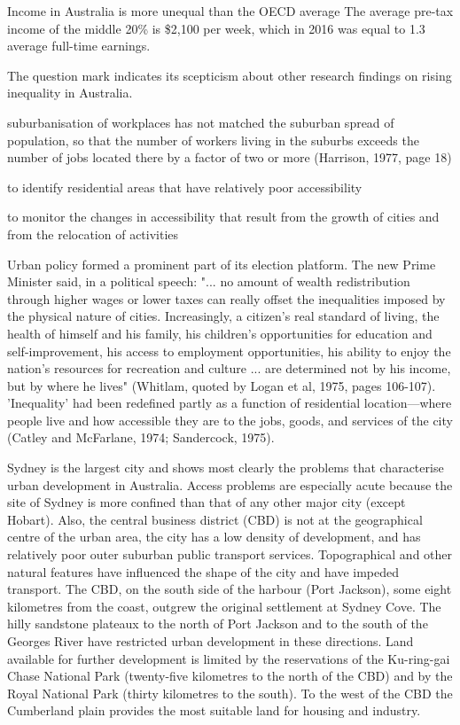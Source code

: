 Income in Australia is more unequal than the OECD average
The average pre-tax income of the middle 20\% is \$2,100 per week, which in 2016 was equal to 1.3 average full-time earnings. 

The question mark indicates its scepticism about other research findings on rising inequality in Australia.

\cite{black1977accessibility}  suburbanisation of workplaces has not matched the
suburban spread of population, so that the number of workers living in the suburbs
exceeds the number of jobs located there by a factor of two or more (Harrison, 1977,
page 18)

to identify residential areas
that have relatively poor accessibility

to monitor the changes in accessibility
that result from the growth of cities and from the relocation of activities

Urban policy formed a prominent part of its election platform. The new Prime Minister said, in a political speech: "... no amount of wealth redistribution through higher wages or lower taxes can really offset the inequalities imposed by the physical nature of cities. Increasingly, a citizen's real standard of living, the health of himself and his family, his children's opportunities for education and self-improvement, his access to employment opportunities, his ability to enjoy the nation's resources for recreation and culture ... are determined not by his income, but by where he lives" (Whitlam, quoted by Logan et al, 1975, pages 106-107). 'Inequality' had been redefined partly as a function of residential location—where people live and how
accessible they are to the jobs, goods, and services of the city (Catley and McFarlane,
1974; Sandercock, 1975). 

Sydney is the largest city and shows most clearly the problems that characterise urban development in Australia. Access problems are especially acute because the site of Sydney is more confined than that of any other major city (except Hobart). Also, the central business district (CBD) is not at the geographical centre of the urban area, the city has a low density of development, and has relatively poor outer suburban public transport services. Topographical and other natural features have influenced the shape of the city and have impeded transport. The CBD, on the south side of the harbour (Port Jackson), some eight kilometres from the coast, outgrew the original settlement at Sydney Cove. The hilly sandstone plateaux to the north of Port Jackson and to the south of the Georges River have restricted urban development in these directions. Land available for further development is limited by the reservations of the Ku-ring-gai Chase National Park (twenty-five kilometres to the north of the CBD) and by the Royal National Park (thirty kilometres to the south). To the west of the CBD the Cumberland plain provides the most suitable land for housing and industry. 

